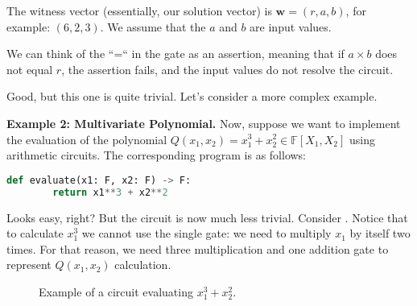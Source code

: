 \documentclass[../lecture-notes.tex]{subfiles}
\begin{document}
The witness vector (essentially, our solution vector) is $\mathbf{w} = (r, a, b)$, for example: $(6, 2, 3)$. We 
assume that the $a$ and $b$ are input values. 

We can think of the ``=`` in the gate as an assertion, meaning that if $a \times b$ does not equal
$r$, the assertion fails, and the input values do not resolve the circuit.

Good, but this one is quite trivial. Let's consider a more complex example.

\textbf{Example 2: Multivariate Polynomial.} Now, suppose we want to implement the evaluation of the polynomial $Q(x_1,x_2) = x_1^3 + x_2^2 \in \mathbb{F}[X_1,X_2]$ using arithmetic circuits. The corresponding program is as follows:
\begin{lstlisting}[language=Python,numbers=none]
    def evaluate(x1: F, x2: F) -> F:
        return x1**3 + x2**2
\end{lstlisting}

Looks easy, right? But the circuit is now much less trivial. Consider . Notice that to calculate $x_1^3$ we cannot use the single gate: we need to multiply $x_1$ by itself two times. For that reason, we need three multiplication and one addition gate to represent $Q(x_1,x_2)$ calculation.
\begin{figure}[h!]
    \centering
    \caption{Example of a circuit evaluating $x_1^3 + x_2^2$.}
    \label{fig:multivariate-polynomial-circuit}
\end{figure}
\end{document}
